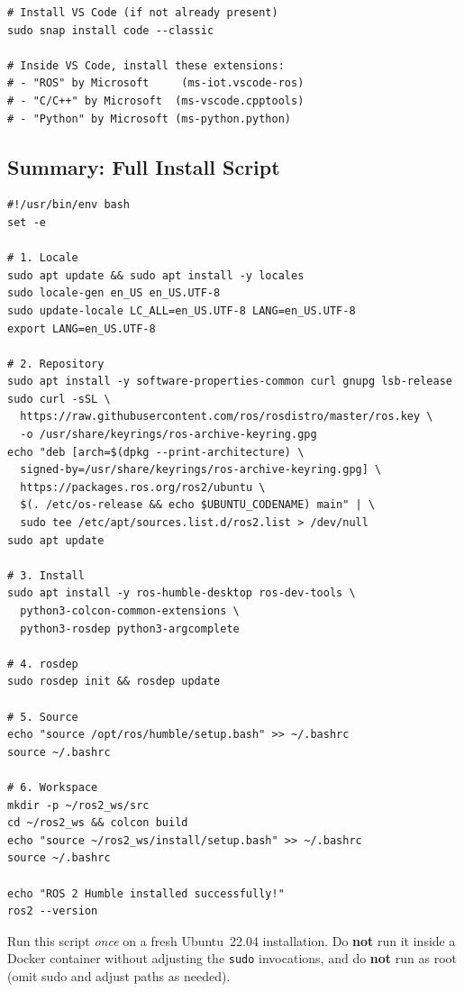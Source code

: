 \documentclass[12pt,a4paper]{article}
\newcommand{\code}[1]{\texttt{#1}}
\begin{document}
\begin{lstlisting}[style=bash]
# Install VS Code (if not already present)
sudo snap install code --classic

# Inside VS Code, install these extensions:
# - "ROS" by Microsoft     (ms-iot.vscode-ros)
# - "C/C++" by Microsoft  (ms-vscode.cpptools)
# - "Python" by Microsoft (ms-python.python)
\end{lstlisting}

\subsection{Summary: Full Install Script}

\begin{lstlisting}[style=bash,caption={One-shot install script for ROS~2 Humble on Ubuntu~22.04}]
#!/usr/bin/env bash
set -e

# 1. Locale
sudo apt update && sudo apt install -y locales
sudo locale-gen en_US en_US.UTF-8
sudo update-locale LC_ALL=en_US.UTF-8 LANG=en_US.UTF-8
export LANG=en_US.UTF-8

# 2. Repository
sudo apt install -y software-properties-common curl gnupg lsb-release
sudo curl -sSL \
  https://raw.githubusercontent.com/ros/rosdistro/master/ros.key \
  -o /usr/share/keyrings/ros-archive-keyring.gpg
echo "deb [arch=$(dpkg --print-architecture) \
  signed-by=/usr/share/keyrings/ros-archive-keyring.gpg] \
  https://packages.ros.org/ros2/ubuntu \
  $(. /etc/os-release && echo $UBUNTU_CODENAME) main" | \
  sudo tee /etc/apt/sources.list.d/ros2.list > /dev/null
sudo apt update

# 3. Install
sudo apt install -y ros-humble-desktop ros-dev-tools \
  python3-colcon-common-extensions \
  python3-rosdep python3-argcomplete

# 4. rosdep
sudo rosdep init && rosdep update

# 5. Source
echo "source /opt/ros/humble/setup.bash" >> ~/.bashrc
source ~/.bashrc

# 6. Workspace
mkdir -p ~/ros2_ws/src
cd ~/ros2_ws && colcon build
echo "source ~/ros2_ws/install/setup.bash" >> ~/.bashrc
source ~/.bashrc

echo "ROS 2 Humble installed successfully!"
ros2 --version
\end{lstlisting}

\begin{notebox}
  Run this script \emph{once} on a fresh Ubuntu~22.04 installation.
  Do \textbf{not} run it inside a Docker container without adjusting the
  \code{sudo} invocations, and do \textbf{not} run as root (omit sudo and
  adjust paths as needed).
\end{notebox}
\end{document}

